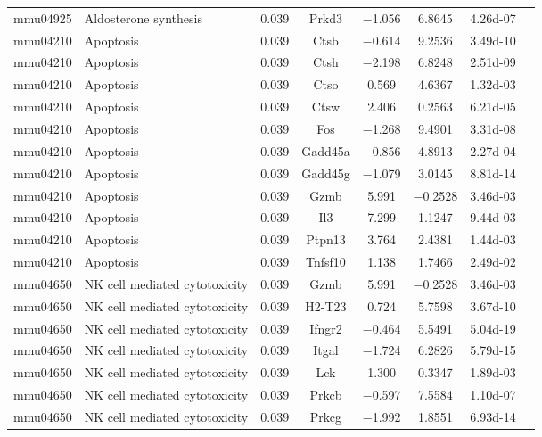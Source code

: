 {\begin{longtable}[l]{cp{4.3cm}cccccc}
mmu04925	& Aldosterone synthesis	& \num{0.039}	& Prkd3	& \num{-1.056}	& \num{ 6.8645}	& \num{4.26d-07}\\ 
mmu04210	& Apoptosis	& \num{0.039}	& Ctsb	& \num{-0.614}	& \num{ 9.2536}	& \num{3.49d-10}\\ 
mmu04210	& Apoptosis	& \num{0.039}	& Ctsh	& \num{-2.198}	& \num{ 6.8248}	& \num{2.51d-09}\\ 
mmu04210	& Apoptosis	& \num{0.039}	& Ctso	& \num{ 0.569}	& \num{ 4.6367}	& \num{1.32d-03}\\ 
mmu04210	& Apoptosis	& \num{0.039}	& Ctsw	& \num{ 2.406}	& \num{ 0.2563}	& \num{6.21d-05}\\ 
mmu04210	& Apoptosis	& \num{0.039}	& Fos	& \num{-1.268}	& \num{ 9.4901}	& \num{3.31d-08}\\ 
mmu04210	& Apoptosis	& \num{0.039}	& Gadd45a	& \num{-0.856}	& \num{ 4.8913}	& \num{2.27d-04}\\ 
mmu04210	& Apoptosis	& \num{0.039}	& Gadd45g	& \num{-1.079}	& \num{ 3.0145}	& \num{8.81d-14}\\ 
mmu04210	& Apoptosis	& \num{0.039}	& Gzmb	& \num{ 5.991}	& \num{-0.2528}	& \num{3.46d-03}\\ 
mmu04210	& Apoptosis	& \num{0.039}	& Il3	& \num{ 7.299}	& \num{ 1.1247}	& \num{9.44d-03}\\ 
mmu04210	& Apoptosis	& \num{0.039}	& Ptpn13	& \num{ 3.764}	& \num{ 2.4381}	& \num{1.44d-03}\\ 
mmu04210	& Apoptosis	& \num{0.039}	& Tnfsf10	& \num{ 1.138}	& \num{ 1.7466}	& \num{2.49d-02}\\ 
mmu04650	& NK cell mediated cytotoxicity	& \num{0.039}	& Gzmb	& \num{ 5.991}	& \num{-0.2528}	& \num{3.46d-03}\\ 
mmu04650	& NK cell mediated cytotoxicity	& \num{0.039}	& H2-T23	& \num{ 0.724}	& \num{ 5.7598}	& \num{3.67d-10}\\ 
mmu04650	& NK cell mediated cytotoxicity	& \num{0.039}	& Ifngr2	& \num{-0.464}	& \num{ 5.5491}	& \num{5.04d-19}\\ 
mmu04650	& NK cell mediated cytotoxicity	& \num{0.039}	& Itgal	& \num{-1.724}	& \num{ 6.2826}	& \num{5.79d-15}\\ 
mmu04650	& NK cell mediated cytotoxicity	& \num{0.039}	& Lck	& \num{ 1.300}	& \num{ 0.3347}	& \num{1.89d-03}\\ 
mmu04650	& NK cell mediated cytotoxicity	& \num{0.039}	& Prkcb	& \num{-0.597}	& \num{ 7.5584}	& \num{1.10d-07}\\ 
mmu04650	& NK cell mediated cytotoxicity	& \num{0.039}	& Prkcg	& \num{-1.992}	& \num{ 1.8551}	& \num{6.93d-14}\\ 

\end{longtable}}
